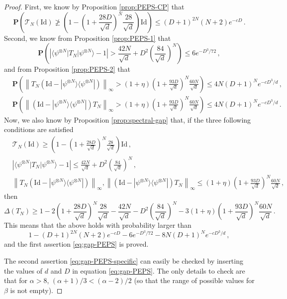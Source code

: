 \documentclass{amsart}
\renewcommand{\P}{\mathbf{P}}
\renewcommand{\leq}{\leqslant}
\renewcommand{\geq}{\geqslant}
\newcommand{\Id}{\mathrm{Id}}
\newcommand{\ketbra}[2]{| #1 \rangle\!\langle #2 |}
\newcommand{\bra}[1]{\langle #1 |}
\newcommand{\ket}[1]{| #1 \rangle}
\begin{document}
\begin{proof}
    First, we know by Proposition \ref{prop:PEPS-CP} that
    \[ \P\left( \mathcal T_N(\Id) \ngeq \left(1- \left(1+\frac{28D}{\sqrt{d}}\right)^N\frac{28}{\sqrt{d}} \right) \Id \right) \leq (D+1)^{2N} (N+2)e^{-cD} \, . \]
    Second, we know from Proposition \ref{prop:PEPS-1} that
    \[ \P\left( \left| \bra{\psi^{\otimes N}}T_N\ket{\psi^{\otimes N}} - 1 \right| > \frac{42N}{\sqrt{d}}+D^2\left(\frac{84}{\sqrt{d}}\right)^N \right) \leq 6e^{-D^3/72} \, , \]
    and from Proposition \ref{prop:PEPS-2} that
    \begin{align*}
         & \P\left( \left\|T_N(\Id-\ketbra{\psi^{\otimes N}}{\psi^{\otimes N}})\right\|_{\infty} > (1+\eta)\left(1+\frac{93D}{\sqrt{d}}\right)^N\frac{60N}{\sqrt{d}} \right) \leq 4N(D+1)^{N}e^{-cD^3/d} \, , \\
         & \P\left( \left\|(\Id-\ketbra{\psi^{\otimes N}}{\psi^{\otimes N}})T_N\right\|_{\infty} > (1+\eta)\left(1+\frac{93D}{\sqrt{d}}\right)^N\frac{60N}{\sqrt{d}} \right) \leq 4N(D+1)^{N}e^{-cD^3/d} \, .
    \end{align*}
    Now, we also know by Proposition \ref{prop:spectral-gap} that, if the three following conditions are satisfied
    \begin{align*}
         & \mathcal T_N(\Id) \geq \left(1- \left(1+\frac{28D}{\sqrt{d}}\right)^N\frac{28}{\sqrt{d}} \right) \Id \, ,                                                                                                                              \\
         & \left| \bra{\psi^{\otimes N}}T_N\ket{\psi^{\otimes N}} - 1 \right| \leq \frac{42N}{\sqrt{d}}+D^2\left(\frac{84}{\sqrt{d}}\right)^N \, ,                                                                                                \\
         & \left\|T_N(\Id-\ketbra{\psi^{\otimes N}}{\psi^{\otimes N}})\right\|_{\infty}, \left\|(\Id-\ketbra{\psi^{\otimes N}}{\psi^{\otimes N}})T_N\right\|_{\infty} \leq (1+\eta)\left(1+\frac{93D}{\sqrt{d}}\right)^N\frac{60N}{\sqrt{d}} \, ,
    \end{align*}
    then
    \[ \Delta(T_N) \geq 1 - 2\left(1+\frac{28D}{\sqrt{d}}\right)^N\frac{28}{\sqrt{d}} - \frac{42N}{\sqrt{d}}-D^2\left(\frac{84}{\sqrt{d}}\right)^N - 3(1+\eta)\left(1+\frac{93D}{\sqrt{d}}\right)^N\frac{60N}{\sqrt{d}} \, . \]
    This means that the above holds with probability larger than
    \[ 1-(D+1)^{2N} (N+2)e^{-cD}-6e^{-D^3/72}-8N(D+1)^{N}e^{-cD^3/d} \, , \]
    and the first assertion \eqref{eq:gap-PEPS} is proved.

    The second assertion \eqref{eq:gap-PEPS-specific} can easily be checked by inserting the values of $d$ and $D$ in equation \eqref{eq:gap-PEPS}. The only details to check are that for $\alpha>8$, $(\alpha+1)/3<(\alpha-2)/2$ (so that the range of possible values for $\beta$ is not empty).
\end{proof}
\end{document}
